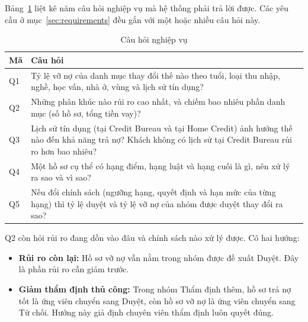 \medskip

Bảng~\ref{tab:business-questions} liệt kê năm câu hỏi nghiệp vụ mà hệ thống phải trả lời được. Các yêu cầu ở mục~\ref{sec:requirements} đều gắn với một hoặc nhiều câu hỏi này.

\begin{table}[H]
	\centering
	\caption{Câu hỏi nghiệp vụ}
	\label{tab:business-questions}
	\footnotesize
	\begin{tabular}{l p{14.5cm}}
		\toprule
		\textbf{Mã} & \textbf{Câu hỏi}                                                                                                                                              \\
		\midrule
		Q1          & Tỷ lệ vỡ nợ của danh mục thay đổi thế nào theo tuổi, loại thu nhập, nghề, học vấn, nhà ở, vùng và lịch sử tín dụng?                                           \\
		Q2          & Những phân khúc nào rủi ro cao nhất, và chiếm bao nhiêu phần danh mục (số hồ sơ, tổng tiền vay)?                                                              \\
		Q3          & Lịch sử tín dụng (tại Credit Bureau và tại Home Credit) ảnh hưởng thế nào đến khả năng trả nợ? Khách không có lịch sử tại Credit Bureau rủi ro hơn bao nhiêu? \\
		Q4          & Một hồ sơ cụ thể có hạng điểm, hạng luật và hạng cuối là gì, nên xử lý ra sao và vì sao?                                                                      \\
		Q5          & Nếu đổi chính sách (ngưỡng hạng, quyết định và hạn mức của từng hạng) thì tỷ lệ duyệt và tỷ lệ vỡ nợ của nhóm được duyệt thay đổi ra sao?                     \\
		\bottomrule
	\end{tabular}
\end{table}

Q2 còn hỏi rủi ro đang dồn vào đâu và chính sách nào xử lý được. Có hai hướng:
\begin{itemize}[topsep=0pt, itemsep=1pt]
	\item \textbf{Rủi ro còn lại:} Hồ sơ vỡ nợ vẫn nằm trong nhóm được đề xuất Duyệt. Đây là phần rủi ro cần giảm trước.
	\item \textbf{Giảm thẩm định thủ công:} Trong nhóm Thẩm định thêm, hồ sơ trả nợ tốt là ứng viên chuyển sang Duyệt, còn hồ sơ vỡ nợ là ứng viên chuyển sang Từ chối. Hướng này giả định chuyên viên thẩm định luôn quyết đúng.
\end{itemize}

